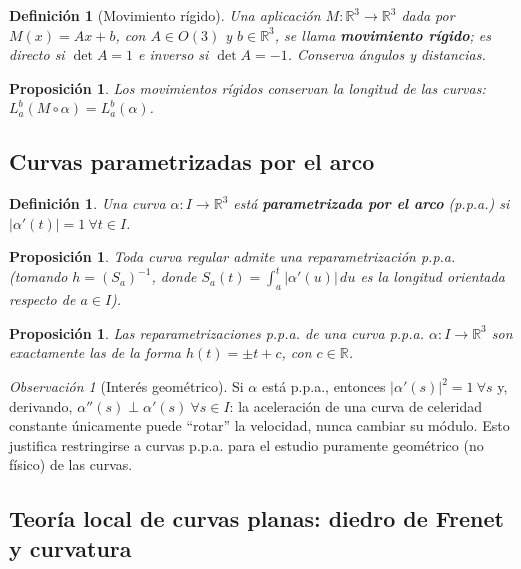 \documentclass[11pt]{article}
\theoremstyle{plain}
\newtheorem{definicion}[teorema]{Definición}
\newtheorem{proposicion}[teorema]{Proposición}
\theoremstyle{definition}
\theoremstyle{remark}
\newtheorem{observacion}[teorema]{Observación}
\begin{document}
\begin{definicion}[Movimiento rígido]
Una aplicación $M:\mathbb{R}^3\to\mathbb{R}^3$ dada por $M(x)=Ax+b$, con $A\in O(3)$ y $b\in\mathbb{R}^3$, se llama \textbf{movimiento rígido}; es directo si $\det A=1$ e inverso si $\det A=-1$. Conserva ángulos y distancias.
\end{definicion}

\begin{proposicion}
Los movimientos rígidos conservan la longitud de las curvas: $L_a^b(M\circ\alpha)=L_a^b(\alpha)$.
\end{proposicion}

\subsection{Curvas parametrizadas por el arco}

\begin{definicion}
Una curva $\alpha:I\to\mathbb{R}^3$ está \textbf{parametrizada por el arco} (p.p.a.) si $|\alpha'(t)|=1\ \forall t\in I$.
\end{definicion}

\begin{proposicion}
Toda curva regular admite una reparametrización p.p.a. (tomando $h={(S_a)}^{-1}$, donde $S_a(t)=\int_a^t|\alpha'(u)|\,du$ es la \emph{longitud orientada} respecto de $a\in I$).
\end{proposicion}

\begin{proposicion}
Las reparametrizaciones p.p.a. de una curva p.p.a. $\alpha:I\to\mathbb{R}^3$ son exactamente las de la forma $h(t)=\pm t+c$, con $c\in\mathbb{R}$.
\end{proposicion}

\begin{observacion}[Interés geométrico]
Si $\alpha$ está p.p.a., entonces $|\alpha'(s)|^2=1\ \forall s$ y, derivando, $\alpha''(s)\perp\alpha'(s)\ \forall s\in I$: la aceleración de una curva de celeridad constante únicamente puede ``rotar'' la velocidad, nunca cambiar su módulo. Esto justifica restringirse a curvas p.p.a. para el estudio puramente geométrico (no físico) de las curvas.
\end{observacion}

\subsection{Teoría local de curvas planas: diedro de Frenet y curvatura}
\end{document}
